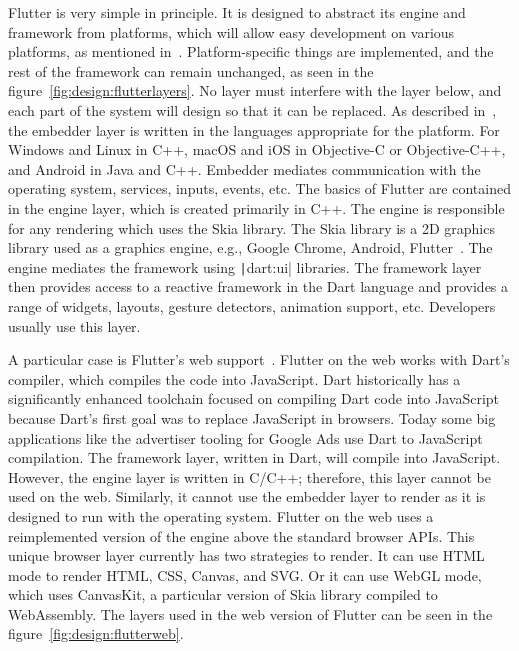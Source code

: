 Flutter is very simple in principle.
It is designed to abstract its engine and framework from platforms, which will allow easy development on various platforms, as mentioned in~\cite{a2022_flutter_architecture}.
Platform-specific things are implemented, and the rest of the framework can remain unchanged, as seen in the figure~\ref{fig:design:flutterlayers}.
No layer must interfere with the layer below, and each part of the system will design so that it can be replaced.
As described in~\cite{a2022_flutter_architecture}, the embedder layer is written in the languages appropriate for the platform.
For Windows and Linux in C++, macOS and iOS in Objective-C or Objective-C++, and Android in Java and C++.
Embedder mediates communication with the operating system, services, inputs, events, etc.
The basics of Flutter are contained in the engine layer, which is created primarily in C++.
The engine is responsible for any rendering which uses the Skia library.
The Skia library is a 2D graphics library used as a graphics engine, e.g., Google Chrome, Android, Flutter~\cite{skia_2022_skia}.
The engine mediates the framework using \texttt|dart:ui| libraries.
The framework layer then provides access to a reactive framework in the Dart language and provides a range of widgets, layouts, gesture detectors, animation support, etc.
Developers usually use this layer.

A particular case is Flutter's web support~\cite{a2022_flutter_architecture}.
Flutter on the web works with Dart's compiler, which compiles the code into JavaScript.
Dart historically has a significantly enhanced toolchain focused on compiling Dart code into JavaScript because Dart's first goal was to replace JavaScript in browsers.
Today some big applications like the advertiser tooling for Google Ads use Dart to JavaScript compilation.
The framework layer, written in Dart, will compile into JavaScript.
However, the engine layer is written in C/C++; therefore, this layer cannot be used on the web.
Similarly, it cannot use the embedder layer to render as it is designed to run with the operating system.
Flutter on the web uses a reimplemented version of the engine above the standard browser APIs.
This unique browser layer currently has two strategies to render.
It can use HTML mode to render HTML, CSS, Canvas, and SVG.
Or it can use WebGL mode, which uses CanvasKit, a particular version of Skia library compiled to WebAssembly.
The layers used in the web version of Flutter can be seen in the figure~\ref{fig:design:flutterweb}.

